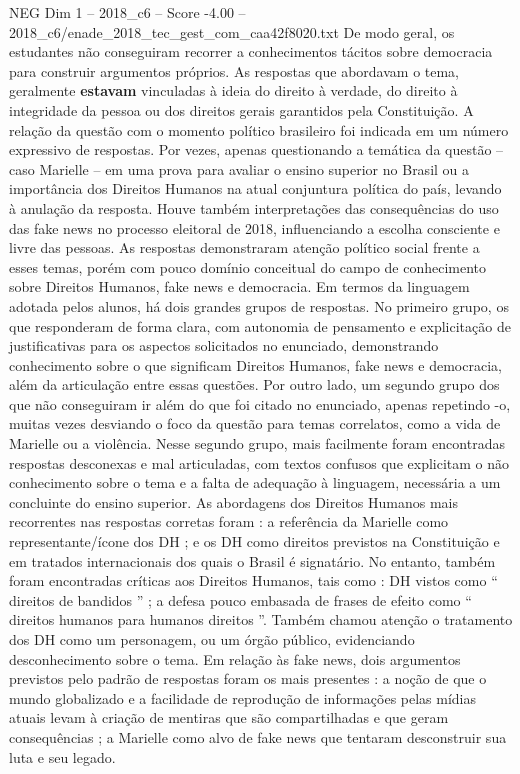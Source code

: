 \begin{textsample}{NEG Dim 1 – 2018\_c6 – Score -4.00 – 2018\_c6/enade\_2018\_tec\_gest\_com\_caa42f8020.txt}
De modo geral, os estudantes não conseguiram recorrer a conhecimentos tácitos sobre democracia para construir argumentos próprios.
As respostas que abordavam o tema, geralmente \textbf{estavam} vinculadas à ideia do direito à verdade, do direito à integridade da pessoa ou dos direitos gerais garantidos pela Constituição.
A relação da questão com o momento político brasileiro foi indicada em um número expressivo de respostas.
Por vezes, apenas questionando a temática da questão – caso Marielle – em uma prova para avaliar o ensino superior no Brasil ou a importância dos Direitos Humanos na atual conjuntura política do país, levando à anulação da resposta.
Houve também interpretações das consequências do uso das fake news no processo eleitoral de 2018, influenciando a escolha consciente e livre das pessoas.
As respostas demonstraram atenção político social frente a esses temas, porém com pouco domínio conceitual do campo de conhecimento sobre Direitos Humanos, fake news e democracia.
Em termos da linguagem adotada pelos alunos, há dois grandes grupos de respostas.
No primeiro grupo, os que responderam de forma clara, com autonomia de pensamento e explicitação de justificativas para os aspectos solicitados no enunciado, demonstrando conhecimento sobre o que significam Direitos Humanos, fake news e democracia, além da articulação entre essas questões.
Por outro lado, um segundo grupo dos que não conseguiram ir além do que foi citado no enunciado, apenas repetindo -o, muitas vezes desviando o foco da questão para temas correlatos, como a vida de Marielle ou a violência.
Nesse segundo grupo, mais facilmente foram encontradas respostas desconexas e mal articuladas, com textos confusos que explicitam o não conhecimento sobre o tema e a falta de adequação à linguagem, necessária a um concluinte do ensino superior.
As abordagens dos Direitos Humanos mais recorrentes nas respostas corretas foram : a referência da Marielle como representante/ícone dos DH ; e os DH como direitos previstos na Constituição e em tratados internacionais dos quais o Brasil é signatário.
No entanto, também foram encontradas críticas aos Direitos Humanos, tais como : DH vistos como “ direitos de bandidos ” ; a defesa pouco embasada de frases de efeito como “ direitos humanos para humanos direitos ”.
Também chamou atenção o tratamento dos DH como um personagem, ou um órgão público, evidenciando desconhecimento sobre o tema.
Em relação às fake news, dois argumentos previstos pelo padrão de respostas foram os mais presentes : a noção de que o mundo globalizado e a facilidade de reprodução de informações pelas mídias atuais levam à criação de mentiras que são compartilhadas e que geram consequências ; a Marielle como alvo de fake news que tentaram desconstruir sua luta e seu legado.

\end{textsample}
